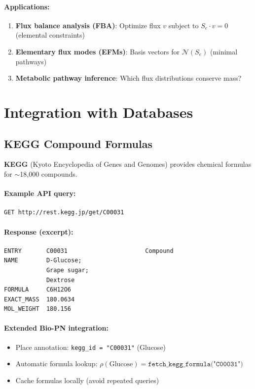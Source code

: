 \paragraph{Applications:}
\begin{enumerate}
    \item \textbf{Flux balance analysis (FBA)}: Optimize flux $v$ subject to $S_e \cdot v = 0$ (elemental constraints)
    \item \textbf{Elementary flux modes (EFMs)}: Basis vectors for $\mathcal{N}(S_e)$ (minimal pathways)
    \item \textbf{Metabolic pathway inference}: Which flux distributions conserve mass?
\end{enumerate}

\section{Integration with Databases}
\label{sec:database-integration}

\subsection{KEGG Compound Formulas}
\label{subsec:kegg-integration}

\textbf{KEGG} (Kyoto Encyclopedia of Genes and Genomes) provides chemical formulas for $\sim$18,000 compounds.

\paragraph{Example API query:}
\begin{verbatim}
GET http://rest.kegg.jp/get/C00031
\end{verbatim}

\paragraph{Response (excerpt):}
\begin{verbatim}
ENTRY       C00031                      Compound
NAME        D-Glucose;
            Grape sugar;
            Dextrose
FORMULA     C6H12O6
EXACT_MASS  180.0634
MOL_WEIGHT  180.156
\end{verbatim}

\paragraph{Extended Bio-PN integration:}
\begin{itemize}
    \item Place annotation: \texttt{kegg\_id = "C00031"} (Glucose)
    \item Automatic formula lookup: $\rho(\text{Glucose}) = \texttt{fetch\_kegg\_formula("C00031")}$
    \item Cache formulas locally (avoid repeated queries)
\end{itemize}

